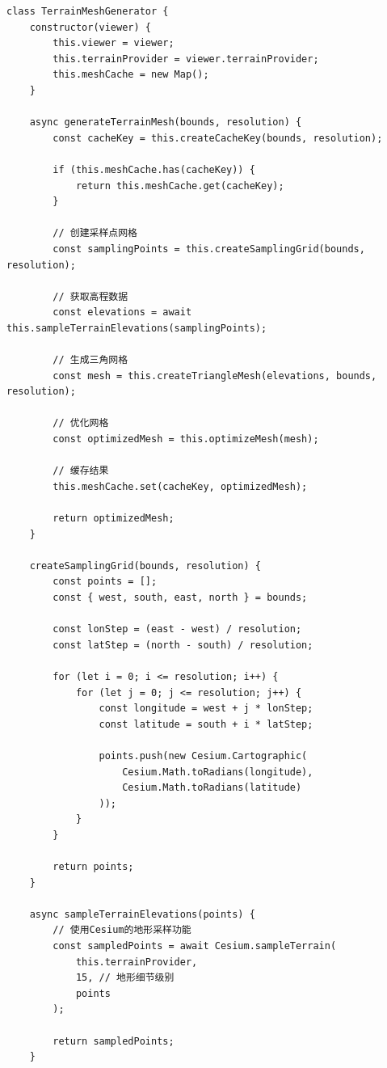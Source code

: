 \begin{lstlisting}
class TerrainMeshGenerator {
    constructor(viewer) {
        this.viewer = viewer;
        this.terrainProvider = viewer.terrainProvider;
        this.meshCache = new Map();
    }
    
    async generateTerrainMesh(bounds, resolution) {
        const cacheKey = this.createCacheKey(bounds, resolution);
        
        if (this.meshCache.has(cacheKey)) {
            return this.meshCache.get(cacheKey);
        }
        
        // 创建采样点网格
        const samplingPoints = this.createSamplingGrid(bounds, resolution);
        
        // 获取高程数据
        const elevations = await this.sampleTerrainElevations(samplingPoints);
        
        // 生成三角网格
        const mesh = this.createTriangleMesh(elevations, bounds, resolution);
        
        // 优化网格
        const optimizedMesh = this.optimizeMesh(mesh);
        
        // 缓存结果
        this.meshCache.set(cacheKey, optimizedMesh);
        
        return optimizedMesh;
    }
    
    createSamplingGrid(bounds, resolution) {
        const points = [];
        const { west, south, east, north } = bounds;
        
        const lonStep = (east - west) / resolution;
        const latStep = (north - south) / resolution;
        
        for (let i = 0; i <= resolution; i++) {
            for (let j = 0; j <= resolution; j++) {
                const longitude = west + j * lonStep;
                const latitude = south + i * latStep;
                
                points.push(new Cesium.Cartographic(
                    Cesium.Math.toRadians(longitude),
                    Cesium.Math.toRadians(latitude)
                ));
            }
        }
        
        return points;
    }
    
    async sampleTerrainElevations(points) {
        // 使用Cesium的地形采样功能
        const sampledPoints = await Cesium.sampleTerrain(
            this.terrainProvider,
            15, // 地形细节级别
            points
        );
        
        return sampledPoints;
    }
    

\end{lstlisting}

